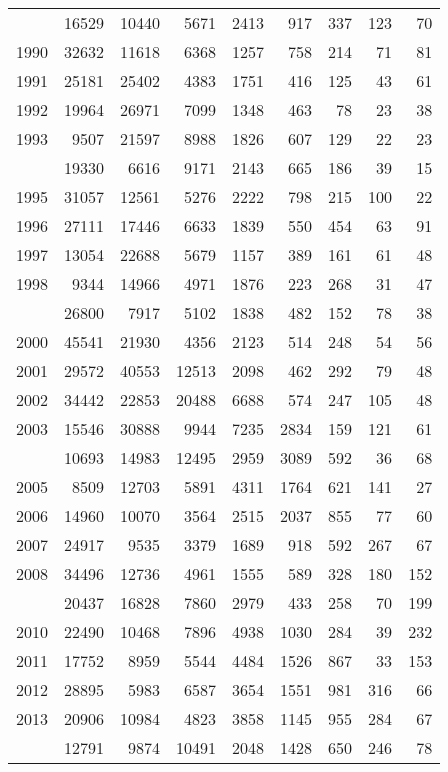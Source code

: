 \documentclass[
]{article}
\begin{document}
\begin{longtable}[t]{lrrrrrrrr}
\endfoot
\bottomrule
\endlastfoot
1989 & 16529 & 10440 & 5671 & 2413 & 917 & 337 & 123 & 70\\
1990 & 32632 & 11618 & 6368 & 1257 & 758 & 214 & 71 & 81\\
1991 & 25181 & 25402 & 4383 & 1751 & 416 & 125 & 43 & 61\\
1992 & 19964 & 26971 & 7099 & 1348 & 463 & 78 & 23 & 38\\
1993 & 9507 & 21597 & 8988 & 1826 & 607 & 129 & 22 & 23\\
\addlinespace
1994 & 19330 & 6616 & 9171 & 2143 & 665 & 186 & 39 & 15\\
1995 & 31057 & 12561 & 5276 & 2222 & 798 & 215 & 100 & 22\\
1996 & 27111 & 17446 & 6633 & 1839 & 550 & 454 & 63 & 91\\
1997 & 13054 & 22688 & 5679 & 1157 & 389 & 161 & 61 & 48\\
1998 & 9344 & 14966 & 4971 & 1876 & 223 & 268 & 31 & 47\\
\addlinespace
1999 & 26800 & 7917 & 5102 & 1838 & 482 & 152 & 78 & 38\\
2000 & 45541 & 21930 & 4356 & 2123 & 514 & 248 & 54 & 56\\
2001 & 29572 & 40553 & 12513 & 2098 & 462 & 292 & 79 & 48\\
2002 & 34442 & 22853 & 20488 & 6688 & 574 & 247 & 105 & 48\\
2003 & 15546 & 30888 & 9944 & 7235 & 2834 & 159 & 121 & 61\\
\addlinespace
2004 & 10693 & 14983 & 12495 & 2959 & 3089 & 592 & 36 & 68\\
2005 & 8509 & 12703 & 5891 & 4311 & 1764 & 621 & 141 & 27\\
2006 & 14960 & 10070 & 3564 & 2515 & 2037 & 855 & 77 & 60\\
2007 & 24917 & 9535 & 3379 & 1689 & 918 & 592 & 267 & 67\\
2008 & 34496 & 12736 & 4961 & 1555 & 589 & 328 & 180 & 152\\
\addlinespace
2009 & 20437 & 16828 & 7860 & 2979 & 433 & 258 & 70 & 199\\
2010 & 22490 & 10468 & 7896 & 4938 & 1030 & 284 & 39 & 232\\
2011 & 17752 & 8959 & 5544 & 4484 & 1526 & 867 & 33 & 153\\
2012 & 28895 & 5983 & 6587 & 3654 & 1551 & 981 & 316 & 66\\
2013 & 20906 & 10984 & 4823 & 3858 & 1145 & 955 & 284 & 67\\
\addlinespace
2014 & 12791 & 9874 & 10491 & 2048 & 1428 & 650 & 246 & 78\\

\end{longtable}
\end{document}
